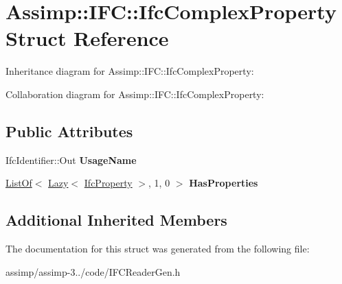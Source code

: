 \hypertarget{struct_assimp_1_1_i_f_c_1_1_ifc_complex_property}{\section{Assimp\+:\+:I\+F\+C\+:\+:Ifc\+Complex\+Property Struct Reference}
\label{struct_assimp_1_1_i_f_c_1_1_ifc_complex_property}
}


Inheritance diagram for Assimp\+:\+:I\+F\+C\+:\+:Ifc\+Complex\+Property\+:


Collaboration diagram for Assimp\+:\+:I\+F\+C\+:\+:Ifc\+Complex\+Property\+:
\subsection*{Public Attributes}
\begin{DoxyCompactItemize}
\item 
\hypertarget{struct_assimp_1_1_i_f_c_1_1_ifc_complex_property_ae23ceda731bc77110bdab8902e942d69}{Ifc\+Identifier\+::\+Out {\bfseries Usage\+Name}}\label{struct_assimp_1_1_i_f_c_1_1_ifc_complex_property_ae23ceda731bc77110bdab8902e942d69}

\item 
\hypertarget{struct_assimp_1_1_i_f_c_1_1_ifc_complex_property_ac31e8eaf554781e259a7807969680874}{\hyperlink{struct_assimp_1_1_s_t_e_p_1_1_list_of}{List\+Of}$<$ \hyperlink{struct_assimp_1_1_s_t_e_p_1_1_lazy}{Lazy}$<$ \hyperlink{struct_assimp_1_1_i_f_c_1_1_ifc_property}{Ifc\+Property} $>$, 1, 0 $>$ {\bfseries Has\+Properties}}\label{struct_assimp_1_1_i_f_c_1_1_ifc_complex_property_ac31e8eaf554781e259a7807969680874}

\end{DoxyCompactItemize}
\subsection*{Additional Inherited Members}


The documentation for this struct was generated from the following file\+:\begin{DoxyCompactItemize}
\item 
assimp/assimp-\/3../code/I\+F\+C\+Reader\+Gen.\+h\end{DoxyCompactItemize}
